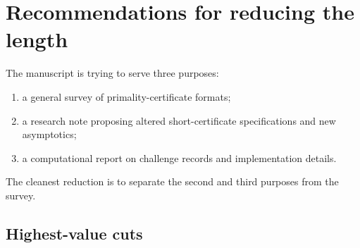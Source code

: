 \documentclass[11pt]{amsart}
\begin{document}
\section{Recommendations for reducing the length}

The manuscript is trying to serve three purposes:

\begin{enumerate}
\item a general survey of primality-certificate formats;
\item a research note proposing altered short-certificate specifications and new asymptotics;
\item a computational report on challenge records and implementation details.
\end{enumerate}

The cleanest reduction is to separate the second and third purposes from the survey.

\subsection{Highest-value cuts}
\end{document}
